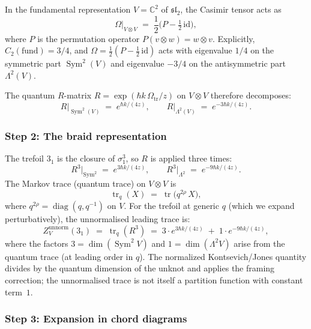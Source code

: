 \documentclass[11pt]{article}
\newcommand{\fsl}{\mathfrak{sl}}
\newcommand{\C}{\mathbb{C}}
\DeclareMathOperator{\Sym}{Sym}
\DeclareMathOperator{\diag}{diag}
\begin{document}
In the fundamental representation $V = \C^2$ of $\fsl_2$, the
Casimir tensor acts as
\begin{equation}\label{eq:casimir-fund}
  \Omega\big|_{V \otimes V}
  \;=\;
  \frac{1}{2}\bigl(P - \tfrac{1}{2}\,\mathrm{id}\bigr),
\end{equation}
where $P$ is the permutation operator $P(v \otimes w) = w \otimes v$.
Explicitly, $C_2(\mathrm{fund}) = 3/4$, and
$\Omega = \frac{1}{2}(P - \frac{1}{2}\,\mathrm{id})$ acts with
eigenvalue $1/4$ on the symmetric part $\Sym^2(V)$
and eigenvalue $-3/4$ on the antisymmetric part
$\Lambda^2(V)$.

The quantum $R$-matrix $R = \exp(\hbar k\,\Omega_{\mathrm{tr}}/z)$ on
$V \otimes V$ therefore decomposes:
\begin{equation}\label{eq:R-eigenvalues}
  R\big|_{\Sym^2(V)}
  \;=\;
  e^{\hbar k/(4z)},
  \qquad
  R\big|_{\Lambda^2(V)}
  \;=\;
  e^{-3\hbar k/(4z)}.
\end{equation}

\subsubsection{Step 2: The braid representation}

The trefoil $3_1$ is the closure of $\sigma_1^3$, so
$R$ is applied three times:
\begin{equation}\label{eq:R-cubed}
  R^3\big|_{\Sym^2}
  \;=\;
  e^{3\hbar k/(4z)},
  \qquad
  R^3\big|_{\Lambda^2}
  \;=\;
  e^{-9\hbar k/(4z)}.
\end{equation}
The Markov trace (quantum trace) on $V \otimes V$ is
\[
  \operatorname{tr}_q(X)
  \;=\;
  \operatorname{tr}\bigl(q^{2\rho}\, X\bigr),
\]
where $q^{2\rho} = \diag(q, q^{-1})$ on $V$.
For the trefoil at generic $q$ (which we expand perturbatively), the
unnormalised leading trace is:
\begin{equation}\label{eq:markov-trace}
  Z_{V}^{\mathrm{unnorm}}(3_1)
  \;=\;
  \operatorname{tr}_q(R^3)
  \;=\;
  3 \cdot e^{3\hbar k/(4z)}
  \;+\;
  1 \cdot e^{-9\hbar k/(4z)},
\end{equation}
where the factors $3 = \dim(\Sym^2 V)$ and
$1 = \dim(\Lambda^2 V)$ arise from the quantum trace
(at leading order in $q$).  The normalized Kontsevich/Jones
quantity divides by the quantum dimension of the unknot and applies
the framing correction; the unnormalised trace is not itself a
partition function with constant term~$1$.

\subsubsection{Step 3: Expansion in chord diagrams}
\end{document}
